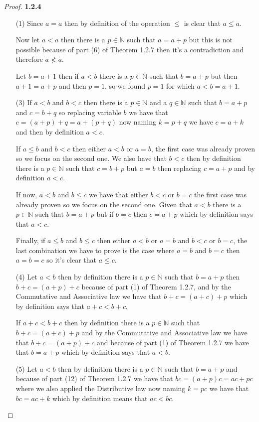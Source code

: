 \documentclass[11pt]{article}
\newcommand{\N}{\mathbb{N}}
\theoremstyle{definition}
\begin{document}
	\begin{proof}{\textbf{1.2.4}}
        \begin{itemize}
        \item [(1)] Since $a = a$ then by definition of the operation $\leq$
        is clear that $a \leq a$.

        Now let $a < a$ then there is a $p\in\N$ such that $a = a + p$ but
        this is not possible because of part (6) of Theorem 1.2.7 then it's
        a contradiction and therefore $a \nless a$.

        Let $b = a + 1$ then if $a < b$ there is a $p \in \N$ such that
        $b = a + p$ but then $a + 1 = a + p$ and then $p = 1$, so we found
        $p = 1$ for which $a < b = a + 1$.
\cleardoublepage
        \item [(3)] If $a < b$ and $b < c$ then there is a $p \in \N$ and a
        $q \in \N$ such that $b = a + p$ and $c = b + q$ so replacing variable
        $b$ we have that $c = (a + p) + q = a + (p + q)$ now naming $k = p + q$
        we have $c = a + k$ and then by definition $a < c$.
        
        If $a \leq b$ and $b <c$ then either $a < b$ or $a = b$, the first case
        was already proven so we focus on the second one. We also have that
        $b < c$ then by definition there is a $p \in \N$ such that $c = b + p$
        but $a = b$ then replacing $c = a + p$ and by definition $a<c$.

        If now, $a < b$ and $b \leq c$ we have that either $b < c$ or $b = c$
        the first case was already proven so we focus on the second one.
        Given that $a < b$ there is a $p \in \N$ such that $b = a +p$ but if
        $b = c$ then $c = a + p$ which by definition says that $a < c$.

        Finally, if $a \leq b$ and $b \leq c$ then either $a<b$ or $a=b$ and
        $b<c$ or $b =c$, the last combination we have to prove is the case
        where $a=b$ and $b=c$ then $a=b=c$ so it's clear that $a \leq c$.
        \item [(4)] Let $a < b$ then by definition there is a $p \in \N$ such
        that $b = a + p$ then $b + c = (a + p) + c$ because of part (1) of
        Theorem 1.2.7, and by the Commutative and Associative law we have that
        $b + c = (a + c) + p$ which by definition says that $a + c < b + c$.

        If $a + c < b +c$ then by definition there is a $p \in \N$ such that
        $b + c = (a + c) + p$ and by the Commutative and Associative law we
        have that $b + c = (a + p) + c$ and because of part (1) of Theorem
        1.2.7 we have that $b = a + p$ which by definition says that $a < b$.
        \item [(5)] Let $a<b$ then by definition there is a $p \in \N$ such
        that $b = a + p$ and because of part (12) of Theorem 1.2.7 we have that
        $bc = (a+p)c = ac + pc$ where we also applied the Distributive law
        now naming $k = pc$ we have that $bc = ac + k$ which by definition
        means that $ac < bc$.


\end{itemize}
\end{proof}
\end{document}
